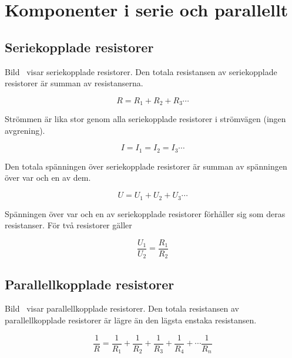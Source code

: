 \section[Serie och parallellt]{Komponenter i serie och parallellt}

\subsection{Seriekopplade resistorer}
\label{seriekopplade_resistorer}


Bild~ visar seriekopplade resistorer.
Den totala resistansen av seriekopplade resistorer är summan av resistanserna.

\[R = R_1 + R_2 + R_3 \cdots \]

Strömmen är lika stor genom alla seriekopplade resistorer i strömvägen (ingen
avgrening).

\[I = I_1 = I_2 = I_3 \cdots \]

Den totala spänningen över seriekopplade resistorer är summan av spänningen över
var och en av dem.

\[U = U_1 + U_2 + U_3 \cdots \]

Spänningen över var och en av seriekopplade resistorer förhåller sig som deras
resistanser. För två resistorer gäller

\[\dfrac{U_1}{U_2} = \dfrac{R_1}{R_2}\]


\subsection{Parallellkopplade resistorer}
\label{parallellkopplade_resistorer}


Bild~ visar parallellkopplade resistorer.
Den totala resistansen av parallellkopplade resistorer är lägre än den lägsta
enstaka resistansen.

\[
\frac{1}{R} = \frac{1}{R_1} + \frac{1}{R_2} +
\frac{1}{R_3} + \frac{1}{R_4} + \cdots \frac{1}{R_n}
\]

